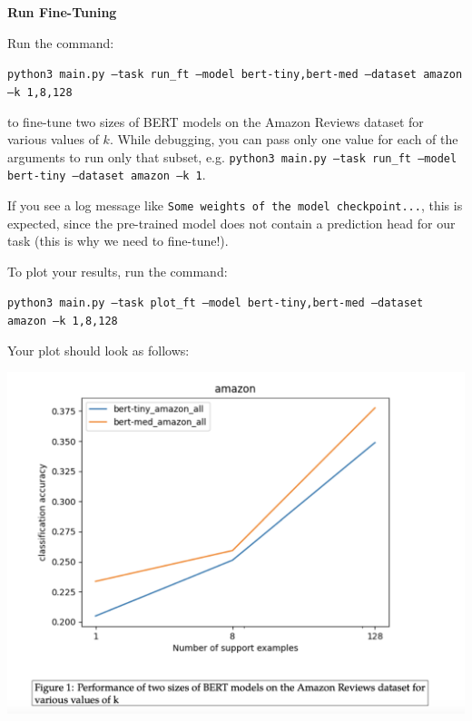 \item {} {\bf Run Fine-Tuning}

Run the command:
    
{\small\texttt{python3 main.py --task run\_ft --model bert-tiny,bert-med --dataset amazon --k 1,8,128}}

to fine-tune two sizes of BERT models on the Amazon Reviews dataset for various values of $k$. While debugging, you can pass only one value for each of the arguments to run only that subset, e.g. \texttt{python3 main.py --task run\_ft --model bert-tiny --dataset amazon --k 1}.

If you see a log message like \texttt{Some weights of the model checkpoint...}, this is expected, since the pre-trained model does not contain a prediction head for our task (this is why we need to fine-tune!).

To plot your results, run the command:

{\small\texttt{python3 main.py --task plot\_ft --model bert-tiny,bert-med --dataset amazon --k 1,8,128}}

Your plot should look as follows:
\begin{center}
    \includegraphics[width=0.75\linewidth]{./figures/finetune-1b}
\end{center}

\clearpage
